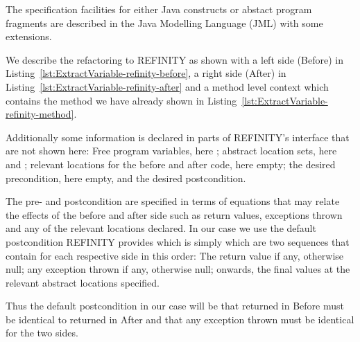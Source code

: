 The specification facilities for either Java constructs or abstact program fragments are described in the Java Modelling Language (JML) with some extensions.

We describe the refactoring to REFINITY as shown with a left side (Before) in Listing~\ref{lst:ExtractVariable-refinity-before},
a right side (After) in Listing~\ref{lst:ExtractVariable-refinity-after} and a method level context which contains the method we have already shown in Listing~\ref{lst:ExtractVariable-refinity-method}.

Additionally some information is declared in parts of REFINITY's interface that are not shown here:
Free program variables, here ; abstract location sets, here  and ; relevant locations for the before and after code, here empty;
the desired precondition, here empty, and the desired postcondition.

The pre- and postcondition are specified in terms of equations that may relate the effects of the before and after side such as return values, exceptions thrown and any of the relevant locations declared.
In our case we use the default postcondition REFINITY provides which is simply  which are two sequences that contain for each respective side in this order:
The return value if any, otherwise null; any exception thrown if any, otherwise null; onwards, the final values at the relevant abstract locations specified.

Thus the default postcondition in our case will be that  returned in Before must be identical to  returned in After and that any exception thrown must be identical for the two sides.

